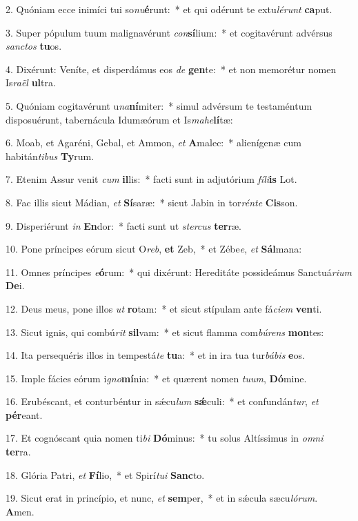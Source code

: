 2. Quóniam ecce inimíci tui so\textit{nu}\textbf{é}runt:~*  et qui odérunt te extu\textit{lé}\textit{runt} \textbf{ca}put.\

3. Super pópulum tuum malignavérunt \textit{con}\textbf{sí}lium:~*  et cogitavérunt advérsus \textit{sanc}\textit{tos} \textbf{tu}os.\

4. Dixérunt: Veníte, et disperdámus eos \textit{de} \textbf{gen}te:~*  et non memorétur nomen Is\textit{ra}\textit{ël} \textbf{ul}tra.\

5. Quóniam cogitavérunt u\textit{na}\textbf{ní}miter:~*  simul advérsum te testaméntum disposuérunt, tabernácula Idumæórum et Is\textit{ma}\textit{he}\textbf{lí}tæ:\

6. Moab, et Agaréni, Gebal, et Ammon, \textit{et} \textbf{A}malec:~*  alienígenæ cum habitán\textit{ti}\textit{bus} \textbf{Ty}rum.\

7. Etenim Assur venit \textit{cum} \textbf{il}lis:~*  facti sunt in adjutórium \textit{fí}\textit{li}\textbf{is} Lot.\

8. Fac illis sicut Mádian, \textit{et} \textbf{Sí}saræ:~*  sicut Jabin in tor\textit{rén}\textit{te} \textbf{Cis}son.\

9. Disperiérunt \textit{in} \textbf{En}dor:~*  facti sunt ut \textit{ster}\textit{cus} \textbf{ter}ræ.\

10. Pone príncipes eórum sicut O\textit{reb}, \textbf{et} Zeb,~*  et Zébe\textit{e}, \textit{et} \textbf{Sál}mana:\

11. Omnes príncipes \textit{e}\textbf{ó}rum:~*  qui dixérunt: Hereditáte possideámus Sanctuá\textit{ri}\textit{um} \textbf{De}i.\

12. Deus meus, pone illos \textit{ut} \textbf{ro}tam:~*  et sicut stípulam ante fá\textit{ci}\textit{em} \textbf{ven}ti.\

13. Sicut ignis, qui combú\textit{rit} \textbf{sil}vam:~*  et sicut flamma com\textit{bú}\textit{rens} \textbf{mon}tes:\

14. Ita persequéris illos in tempestá\textit{te} \textbf{tu}a:~*  et in ira tua tur\textit{bá}\textit{bis} \textbf{e}os.\

15. Imple fácies eórum i\textit{gno}\textbf{mí}nia:~*  et quærent nomen \textit{tu}\textit{um}, \textbf{Dó}mine.\

16. Erubéscant, et conturbéntur in sǽcu\textit{lum} \textbf{sǽ}culi:~*  et confundán\textit{tur}, \textit{et} \textbf{pér}eant.\

17. Et cognóscant quia nomen ti\textit{bi} \textbf{Dó}minus:~*  tu solus Altíssimus in \textit{om}\textit{ni} \textbf{ter}ra.\

18. Glória Patri, \textit{et} \textbf{Fí}lio,~*  et Spirí\textit{tu}\textit{i} \textbf{Sanc}to.\

19. Sicut erat in princípio, et nunc, \textit{et} \textbf{sem}per,~*  et in sǽcula sæcu\textit{ló}\textit{rum}. \textbf{A}men.\

